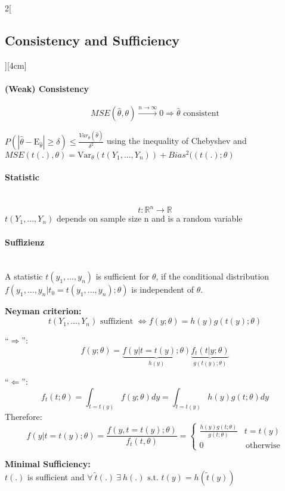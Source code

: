 \documentclass[8pt]{extarticle}
\begin{document}
\begin{multicols}{2}[\subsection{Consistency and Sufficiency}][4cm]

\paragraph{(Weak) Consistency}
$$MSE(\hat{\theta},\theta) \overset{n\rightarrow\infty}{\longrightarrow} 0 \Rightarrow \hat{\theta} \text{ consistent}$$

\begin{Proof}
$P(|\hat{\theta} - \mathrm{E}_{\hat{\theta}}| \geq \delta) \leq \frac{Var_\theta(\hat{\theta})}{\delta^2}$ using the inequality of Chebyshev
and $MSE(t(.), \theta) = \mathrm{Var}_\theta\left(t(Y_1,...,Y_n)\right) + Bias^2((t(.); \theta)$
\end{Proof}

\paragraph{Statistic} \ \\
$$t: \mathbb{R}^n \rightarrow \mathbb{R}$$
$t(Y_1, ..., Y_n)$ depends on sample size n and is a random variable

\paragraph{Suffizienz} \ \\
\noindent A statistic $t(y_1,...,y_n)$ is sufficient for $\theta$, if the conditional distribution $f(y_1,...,y_n|t_0 = t(y_1,...,y_n);\theta)$ is independent of $\theta$. \vspace{0.5em}

\textbf{Neyman criterion:}
$$t(Y_1,...,Y_n) \text{ suffizient } \Leftrightarrow f(y;\theta) = h(y)g\left(t(y);\theta\right)$$
\begin{Proof}
``$\Rightarrow$'':
$$f(y;\theta) = \underbrace{f(y|t = t(y);\theta)}_{h(y)} \underbrace{f_t(t|y;\theta)}_{g(t(y);\theta)}$$

\noindent ``$\Leftarrow$'':
$$f_t(t;\theta) = \int_{t=t(y)} f(y;\theta)dy = \int_{t=t(y)} h(y) g(t;\theta)dy$$
\indent Therefore:
$$f\left(y|t=t(y);\theta\right) = \frac{f(y,t=t(y);\theta)}{f_t(t,\theta)}
= \begin{cases}
\frac{h(y)g(t;\theta)}{g(t;\theta)} & t=t(y) \\
0 & \, \text{otherwise}
\end{cases}$$
\end{Proof}

\textbf{Minimal Sufficiency:} \ \\
$t(.)$ is sufficient and $\forall\: \tilde{t}(.)\: \exists\: h(.) \text{ s.t. } t(y) = h(\tilde{t}(y))$



\end{multicols}
\end{document}

